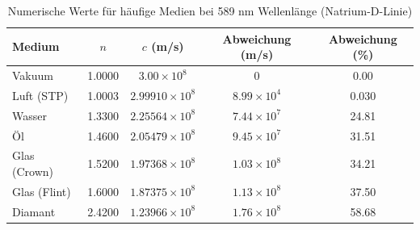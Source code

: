 \documentclass[12pt,a4paper,oneside]{article}
\theoremstyle{definition}
\theoremstyle{remark}
\newcommand{\cLight}{c}
\newcommand{\refIndex}{n}
\begin{document}
\begin{table}[H]
\centering
\small
\begin{tabular}{|l|c|c|c|c|}
\toprule
\textbf{Medium} & $\refIndex$ & $\cLight$ (m/s) & Abweichung (m/s) & Abweichung (\%) \\
\midrule
Vakuum & 1.0000 & $3.00 \times 10^8$ & 0 & 0.00 \\
Luft (STP) & 1.0003 & $2.99910 \times 10^8$ & $8.99 \times 10^4$ & 0.030 \\
Wasser & 1.3300 & $2.25564 \times 10^8$ & $7.44 \times 10^7$ & 24.81 \\
Öl & 1.4600 & $2.05479 \times 10^8$ & $9.45 \times 10^7$ & 31.51 \\
Glas (Crown) & 1.5200 & $1.97368 \times 10^8$ & $1.03 \times 10^8$ & 34.21 \\
Glas (Flint) & 1.6000 & $1.87375 \times 10^8$ & $1.13 \times 10^8$ & 37.50 \\
Diamant & 2.4200 & $1.23966 \times 10^8$ & $1.76 \times 10^8$ & 58.68 \\
\bottomrule
\end{tabular}
\caption{Numerische Werte für häufige Medien bei 589 nm Wellenlänge (Natrium-D-Linie)}
\end{table}
\end{document}
